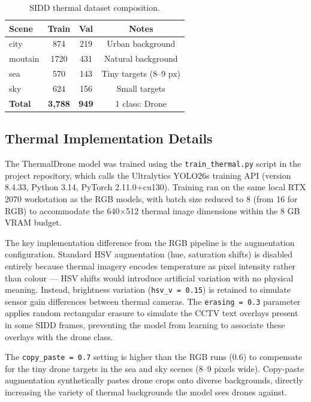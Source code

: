 \documentclass[12pt,a4paper]{report}
\begin{document}
\begin{table}[H]
\centering
\caption{SIDD thermal dataset composition.}
\label{tab:sidd}
\begin{tabular}{|l|c|c|c|}
\hline
\textbf{Scene} & \textbf{Train} & \textbf{Val} & \textbf{Notes} \\
\hline
city    & 874  & 219 & Urban background \\
\hline
moutain & 1720 & 431 & Natural background \\
\hline
sea     & 570  & 143 & Tiny targets (8--9 px) \\
\hline
sky     & 624  & 156 & Small targets \\
\hline
\textbf{Total} & \textbf{3,788} & \textbf{949} & 1 class: Drone \\
\hline
\end{tabular}
\end{table}

\subsection{Thermal Implementation Details}

The ThermalDrone model was trained using the \texttt{train\_thermal.py}
script in the project repository, which calls the Ultralytics YOLO26s
training API (version 8.4.33, Python 3.14, PyTorch 2.11.0+cu130).
Training ran on the same local RTX 2070 workstation as the RGB models,
with batch size reduced to 8 (from 16 for RGB) to accommodate the
640$\times$512 thermal image dimensions within the 8 GB VRAM budget.

The key implementation difference from the RGB pipeline is the augmentation
configuration. Standard HSV augmentation (hue, saturation shifts) is
disabled entirely because thermal imagery encodes temperature as pixel
intensity rather than colour --- HSV shifts would introduce artificial
variation with no physical meaning. Instead, brightness variation
(\texttt{hsv\_v = 0.15}) is retained to simulate sensor gain differences
between thermal cameras. The \texttt{erasing = 0.3} parameter applies
random rectangular erasure to simulate the CCTV text overlays present
in some SIDD frames, preventing the model from learning to associate
these overlays with the drone class.

The \texttt{copy\_paste = 0.7} setting is higher than the RGB runs (0.6)
to compensate for the tiny drone targets in the sea and sky scenes
(8--9 pixels wide). Copy-paste augmentation synthetically pastes drone
crops onto diverse backgrounds, directly increasing the variety of
thermal backgrounds the model sees drones against.
\end{document}

